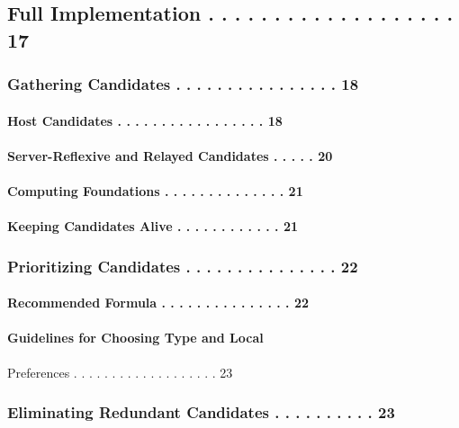 \documentclass{article}
\begin{document}
\subsection{Full Implementation . . . . . . . . . . . . . . . . . . .  17}

\subsubsection{Gathering Candidates  . . . . . . . . . . . . . . . .  18}

\paragraph{Host Candidates . . . . . . . . . . . . . . . . .  18}

\paragraph{Server-Reflexive and Relayed Candidates . . . . .  20}

\paragraph{Computing Foundations . . . . . . . . . . . . . .  21}

\paragraph{Keeping Candidates Alive  . . . . . . . . . . . .  21}

\subsubsection{Prioritizing Candidates . . . . . . . . . . . . . . .  22}

\paragraph{Recommended Formula . . . . . . . . . . . . . . .  22}

\paragraph{Guidelines for Choosing Type and Local}

Preferences . . . . . . . . . . . . . . . . . . .  23

\subsubsection{Eliminating Redundant Candidates  . . . . . . . . . .  23}
\end{document}

